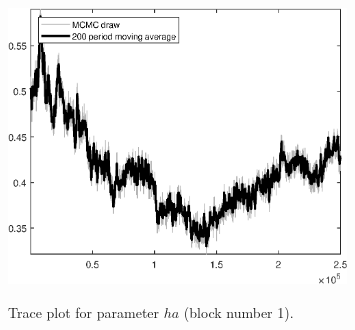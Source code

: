 \begin{figure}[H]
\centering
  \includegraphics[width=0.8\textwidth]{BRS_aggregate/graphs/TracePlot_ha_blck_1}\\
    \caption{Trace plot for parameter ${ha}$ (block number 1).}
\end{figure}
